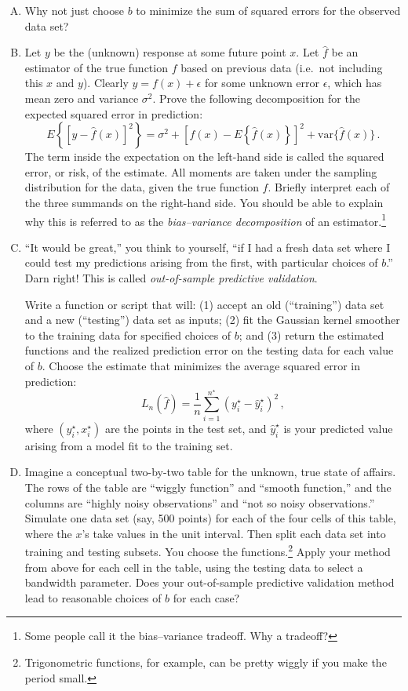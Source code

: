 \documentclass{mynotes}
\begin{document}
\begin{enumerate}[(A)]

\item Why not just choose $b$ to minimize the sum of squared errors for the observed data set?

\item Let $y$ be the (unknown) response at some future point $x$.  Let $\hat{f}$ be an estimator of the true function $f$ based on previous data (i.e.~not including this $x$ and $y$).  Clearly $y = f(x) + \epsilon$ for some unknown error $\epsilon$, which has mean zero and variance $\sigma^2$.  Prove the following decomposition for the expected squared error in prediction:
$$
E \left\{ \left[ y - \hat{f}(x) \right]^2 \right\} =
\sigma^2 + 
\left[ f(x) - E \left\{  \hat{f} (x) \right\} \right]^2
+   \mbox{var}\{ \hat{f}(x) \} \, .
$$
The term inside the expectation on the left-hand side is called the squared error, or risk, of the estimate.  All moments are taken under the sampling distribution for the data, given the true function $f$.  Briefly interpret each of the three summands on the right-hand side.  You should be able to explain why this is referred to as the \textit{bias--variance decomposition} of an estimator.\footnote{Some people call it the bias--variance tradeoff.  Why a tradeoff?}

\item  ``It would be great,'' you think to yourself, ``if I had a fresh data set where I could test my predictions arising from the first, with particular choices of $b$.''  Darn right!  This is called \textit{out-of-sample predictive validation}.

Write a function or script that will: (1) accept an old (``training'') data set and a new (``testing'') data set as inputs; (2) fit the Gaussian kernel smoother to the training data for specified choices of $b$; and (3) return the estimated functions and the realized prediction error on the testing data for each value of $b$.  Choose the estimate that minimizes the average squared error in prediction:
$$
L_n(\hat{f}) = \frac{1}{n}\sum_{i=1}^{n^{\star}} (y^{\star}_i - \hat{y}_i^{\star} )^2 \, ,
$$
where $(y_i^{\star}, x_i^{\star})$ are the points in the test set, and $ \hat{y}_i^{\star}$ is your predicted value arising from a model fit to the training set.

\item Imagine a conceptual two-by-two table for the unknown, true state of affairs.  The rows of the table are ``wiggly function'' and ``smooth function,'' and the columns are ``highly noisy observations'' and ``not so noisy observations.''  Simulate one data set (say, 500 points) for each of the four cells of this table, where the $x$'s take values in the unit interval.  Then split each data set into training and testing subsets.  You choose the functions.\footnote{Trigonometric functions, for example, can be pretty wiggly if you make the period small.}   Apply your method from above for each cell in the table, using the testing data to select a bandwidth parameter.  Does your out-of-sample predictive validation method lead to reasonable choices of $b$ for each case?


\end{enumerate}
\end{document}
